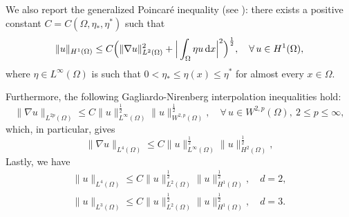 \documentclass[11pt,reqno]{amsart}
\theoremstyle{remark}
\def\d{{\rm d}}
\numberwithin{equation}{section}
\def\d{{\rm d}}
\begin{document}
We also report the generalized Poincar\'{e} inequality (see \cite[Chapter II, Section 1.4]{TEMAM}):
there exists a positive constant $C=C(\Omega, \eta_\ast,\eta^\ast)$ such that
\begin{equation}
\label{normH1-2}
\| u\|_{H^1(\Omega)}\leq C \Big(\| \nabla u\|_{L^2(\Omega)}^2+ \Big|\int_{\Omega}  \eta u \, \d x\Big|^2\Big)^\frac12, \quad \forall \, u \in H^1(\Omega),
\end{equation}
where $\eta \in L^\infty(\Omega)$ is such that $0<\eta_\ast\leq \eta(x)\leq \eta^\ast$ for almost every $x\in \Omega$. 

Furthermore, the following Gagliardo-Nirenberg interpolation inequalities hold:
\begin{equation}
\label{GN-utile}
\| \nabla u \|_{L^{2p}(\Omega)} \leq C \| u\|_{L^\infty(\Omega)}^\frac12 \| u\|_{W^{2,p}(\Omega)}^\frac12, \quad \forall \, u \in W^{2,p}(\Omega), \ 2\leq p \leq \infty,
\end{equation}
which, in particular, gives
\begin{equation}
\label{inter-W14}
\| \nabla u \|_{L^4(\Omega)} \leq C \| u\|_{L^\infty(\Omega)}^\frac12 \| u\|_{H^2(\Omega)}^\frac12,
\end{equation}
Lastly, we have 
\begin{align}
\label{lady_2}
\| u \|_{L^4(\Omega)} \leq C \| u\|_{L^2(\Omega)}^\frac12 \| u\|_{H^1(\Omega)}^\frac12, \quad d=2,
\\
\label{lady_3}
\|  u \|_{L^3(\Omega)} \leq C \| u\|_{L^2(\Omega)}^\frac12 \| u\|_{H^1(\Omega)}^\frac12, \quad d=3.
\end{align}
\end{document}
